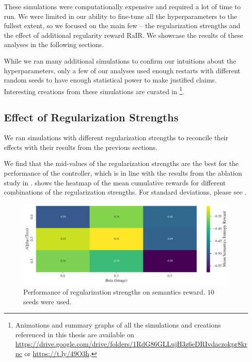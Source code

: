 These simulations were computationally expensive and required a lot of time to run.
We were limited in our ability to fine-tune all the hyperparameters to the fullest extent, so we focused on the main few -- the regularization strengths and the effect of additional regularity reward RaIR.
We showcase the results of these analyses in the following sections.

While we ran many additional simulations to confirm our intuitions about the hyperparameters, only a few of our analyses used enough restarts with different random seeds to have enough statistical power to make justified claims.
Interesting creations from these simulations are curated in \footnote{Animations and summary graphs of all the simulations and creations referenced in this thesis are available on \url{https://drive.google.com/drive/folders/1RdG86GLLujH3z6eDRIvdaczokpr8krnc} or \url{https://t.ly/49O3h}.}.


\subsection{Effect of Regularization Strengths}
\label{sec:alpha-beta-semantics}
We ran simulations with different regularization strengths to reconcile their effects with their results from the previous sections.

We find that the mid-values of the regularization strengths are the best for the performance of the controller, which is in line with the results from the ablation study in .
 shows the heatmap of the mean cumulative rewards for different combinations of the regularization strengths.
For standard deviations, please see .

\begin{figure}[H]
    \centering
    \includegraphics[width=\textwidth]{images/alpha_beta-semantics_rair.pdf}
    \caption[Performance of regularization strengths on semantics reward.]{Performance of regularization strengths on semantics reward. \(10\) seeds were used.}
    \label{fig:alpha-beta-semantics}
\end{figure}

